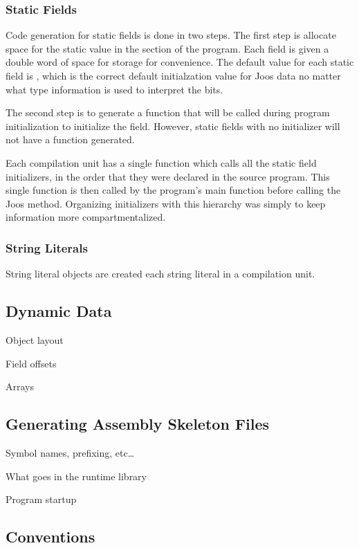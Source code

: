 \documentclass[pdftex,11pt,a4paper]{article}
\begin{document}
\subsubsection{Static Fields}

Code generation for static fields is done in two steps. The first step
is allocate space for the static value in the  section of
the program. Each field is given a double word of space for storage
for convenience. The default value for each static field is ,
which is the correct default initialzation value for Joos data no
matter what type information is used to interpret the bits.

The second step is to generate a function that will be called during
program initialization to initialize the field. However, static fields
with no initializer will not have a function generated.

Each compilation unit has a single function which calls all the static
field initializers, in the order that they were declared in the source
program. This single function is then called by the program's main
function before calling the Joos  method. Organizing
initializers with this hierarchy was simply to keep information more
compartmentalized.

\subsubsection{String Literals}

String literal objects are created each string literal in a
compilation unit.

\subsection{Dynamic Data}

Object layout

Field offsets

Arrays


\subsection{Generating Assembly Skeleton Files}

Symbol names, prefixing, etc\ldots

What goes in the runtime library

Program startup


\subsection{Conventions}
\end{document}
